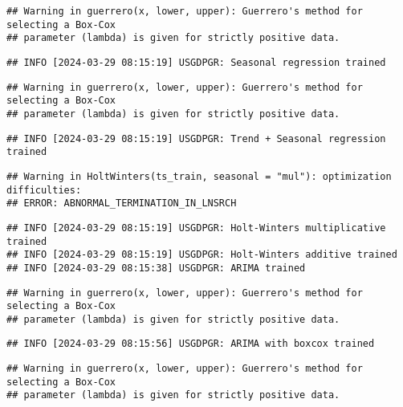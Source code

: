 \documentclass[
]{article}
\begin{document}
\begin{verbatim}
## Warning in guerrero(x, lower, upper): Guerrero's method for selecting a Box-Cox
## parameter (lambda) is given for strictly positive data.
\end{verbatim}

\begin{verbatim}
## INFO [2024-03-29 08:15:19] USGDPGR: Seasonal regression trained
\end{verbatim}

\begin{verbatim}
## Warning in guerrero(x, lower, upper): Guerrero's method for selecting a Box-Cox
## parameter (lambda) is given for strictly positive data.
\end{verbatim}

\begin{verbatim}
## INFO [2024-03-29 08:15:19] USGDPGR: Trend + Seasonal regression trained
\end{verbatim}

\begin{verbatim}
## Warning in HoltWinters(ts_train, seasonal = "mul"): optimization difficulties:
## ERROR: ABNORMAL_TERMINATION_IN_LNSRCH
\end{verbatim}

\begin{verbatim}
## INFO [2024-03-29 08:15:19] USGDPGR: Holt-Winters multiplicative trained
## INFO [2024-03-29 08:15:19] USGDPGR: Holt-Winters additive trained
## INFO [2024-03-29 08:15:38] USGDPGR: ARIMA trained
\end{verbatim}

\begin{verbatim}
## Warning in guerrero(x, lower, upper): Guerrero's method for selecting a Box-Cox
## parameter (lambda) is given for strictly positive data.
\end{verbatim}

\begin{verbatim}
## INFO [2024-03-29 08:15:56] USGDPGR: ARIMA with boxcox trained
\end{verbatim}

\begin{verbatim}
## Warning in guerrero(x, lower, upper): Guerrero's method for selecting a Box-Cox
## parameter (lambda) is given for strictly positive data.
\end{verbatim}
\end{document}
